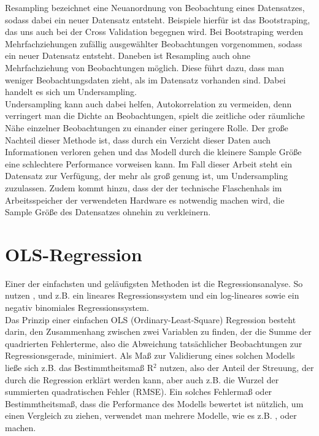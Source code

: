 \documentclass[a4paper,12pt]{thesis}
\begin{document}
Resampling bezeichnet eine Neuanordnung von Beobachtung eines Datensatzes, sodass dabei ein neuer Datensatz entsteht. Beispiele hierfür ist das Bootstraping, das uns auch bei der Cross Validation begegnen wird. Bei Bootstraping werden Mehrfachziehungen zufällig ausgewählter Beobachtungen vorgenommen, sodass ein neuer Datensatz entsteht. Daneben ist Resampling auch ohne Mehrfachziehung von Beobachtungen möglich. Diese führt dazu, dass man weniger Beobachtungsdaten zieht, als im Datensatz vorhanden sind. Dabei handelt es sich um Undersampling.\\
Undersampling kann auch dabei helfen, Autokorrelation zu vermeiden, denn verringert man die Dichte an Beobachtungen, spielt die zeitliche oder räumliche Nähe einzelner Beobachtungen zu einander einer geringere Rolle. Der große Nachteil dieser Methode ist, dass durch ein Verzicht dieser Daten auch Informationen verloren gehen und das Modell durch die kleinere Sample Größe eine schlechtere Performance vorweisen kann. Im Fall dieser Arbeit steht ein Datensatz zur Verfügung, der mehr als groß genung ist, um Undersampling zuzulassen. Zudem kommt hinzu, dass der der technische Flaschenhals im Arbeitsspeicher der verwendeten Hardware es notwendig machen wird, die Sample Größe des Datensatzes ohnehin zu verkleinern.

\section{OLS-Regression}

Einer der einfachsten und geläufigsten Methoden ist die Regressionsanalyse. So nutzen \cite{Holmgren2017}, \cite{Alattar2021} und \cite{Gao2022} z.B. ein lineares Regressionssystem und \cite{Wessel2020} ein log-lineares sowie ein negativ binomiales Regressionssystem.\\
Das Prinzip einer einfachen OLS (Ordinary-Least-Square) Regression besteht darin, den Zusammenhang zwischen zwei Variablen zu finden, der die Summe der quadrierten Fehlerterme, also die Abweichung tatsächlicher Beobachtungen zur Regressionsgerade, minimiert. Als Maß zur Validierung eines solchen Modells ließe sich z.B. das Bestimmtheitsmaß R$^2$ nutzen, also der Anteil der Streuung, der durch die Regression erklärt werden kann, aber auch z.B. die Wurzel der summierten quadratischen Fehler (RMSE). Ein solches Fehlermaß oder Bestimmtheitsmaß, dass die Performance des Modells bewertet ist nützlich, um einen Vergleich zu ziehen, verwendet man mehrere Modelle, wie es z.B. \cite{Holmgren2017}, \cite{Broucke2019} oder \cite{Gao2022} machen.
\end{document}
